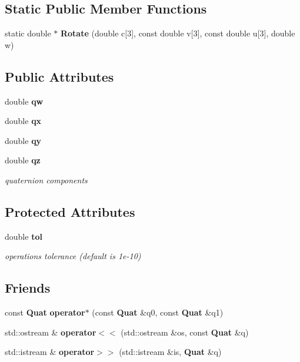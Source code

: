 \subsection*{\-Static \-Public \-Member \-Functions}
\begin{DoxyCompactItemize}
\item 
static double $\ast$ {\bf \-Rotate} (double c[3], const double v[3], const double u[3], double w)
\end{DoxyCompactItemize}
\subsection*{\-Public \-Attributes}
\begin{DoxyCompactItemize}
\item 
double {\bf qw}
\item 
double {\bf qx}
\item 
double {\bf qy}
\item 
double {\bf qz}
\begin{DoxyCompactList}\small\item\em quaternion components \end{DoxyCompactList}\end{DoxyCompactItemize}
\subsection*{\-Protected \-Attributes}
\begin{DoxyCompactItemize}
\item 
double {\bf tol}
\begin{DoxyCompactList}\small\item\em operations tolerance (default is 1e-\/10) \end{DoxyCompactList}\end{DoxyCompactItemize}
\subsection*{\-Friends}
\begin{DoxyCompactItemize}
\item 
const {\bf \-Quat} {\bf operator$\ast$} (const {\bf \-Quat} \&q0, const {\bf \-Quat} \&q1)
\item 
std\-::ostream \& {\bf operator$<$$<$} (std\-::ostream \&os, const {\bf \-Quat} \&q)
\item 
std\-::istream \& {\bf operator$>$$>$} (std\-::istream \&is, {\bf \-Quat} \&q)
\end{DoxyCompactItemize}



